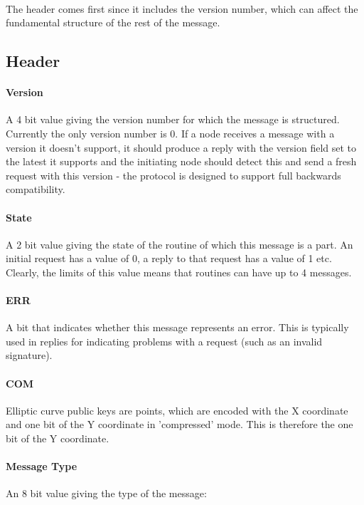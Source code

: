 \documentclass{article}
\begin{document}
\paragraph{}
The header comes first since it includes the version number, which can affect the fundamental structure of the rest of the message.

\subsection{Header}

\paragraph{Version}
A 4 bit value giving the version number for which the message is structured. Currently the only version number is 0. If a node receives a message with a version it doesn't support, it should produce a reply with the version field set to the latest it supports and the initiating node should detect this and send a fresh request with this version - the protocol is designed to support full backwards compatibility.

\paragraph{State}
A 2 bit value giving the state of the routine of which this message is a part. An initial request has a value of 0, a reply to that request has a value of 1 etc. Clearly, the limits of this value means that routines can have up to 4 messages.

\paragraph{ERR}
A bit that indicates whether this message represents an error. This is typically used in replies for indicating problems with a request (such as an invalid signature).

\paragraph{COM}
Elliptic curve public keys are points, which are encoded with the X coordinate and one bit of the Y coordinate in 'compressed' mode. This is therefore the one bit of the Y coordinate.

\paragraph{Message Type}
An 8 bit value giving the type of the message:
\end{document}
